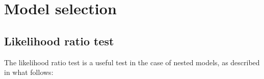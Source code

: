 \documentclass[a4paper,11pt]{article}
\theoremstyle{defi}
\numberwithin{thmCounter}{section}
\begin{document}



\section{Model selection}
\label{sec:model_selection}

\subsection{Likelihood ratio test}
The likelihood ratio test is a useful test in the case of nested models, as described in what follows:
\end{document}
